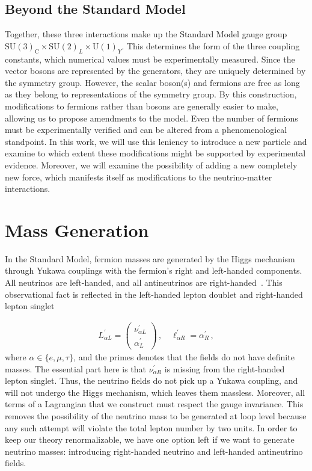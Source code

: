 \subsection{Beyond the Standard Model}
Together, these three interactions make up the Standard Model gauge group $\mathrm{SU}(3)_{\mathrm{C}} \times \mathrm{SU}(2)_{L} \times \mathrm{U}(1)_{Y}$. 
This determines the form of the three coupling constants, which numerical values must be experimentally measured. 
Since the vector bosons are represented by the generators, they are uniquely determined by the symmetry group. However, the scalar boson(s) and fermions are free as long as they
belong to representations of the symmetry group. By this construction, modifications to fermions rather than bosons are generally easier to make, allowing us to propose amendments to the model. Even the
number of fermions must be experimentally verified and can be altered from a phenomenological standpoint. In this work,
we will use this leniency to introduce a new particle and examine to which extent 
these modifications might be supported by experimental evidence. Moreover, we will examine the possibility of adding a new completely new force, which manifests itself as modifications to the neutrino-matter interactions.

\section{Mass Generation}
In the Standard Model, fermion masses are generated by the Higgs mechanism through Yukawa couplings with the fermion's right and left-handed components.
All neutrinos are left-handed, and all antineutrinos are right-handed~\cite{giunti}. This observational fact is reflected in the 
left-handed lepton doublet and right-handed lepton singlet

\begin{align}
    L^\prime_{\alpha L} = \begin{pmatrix}
            \nu^\prime_{\alpha L} \\
        \alpha^\prime_{L} 
    \end{pmatrix}\,, \quad
    \ell^\prime_{\alpha R} =
    \alpha^\prime_{R} \,,            
\end{align}
where $\alpha \in \{e,\mu,\tau\}$, and the primes denotes that the fields do not have definite masses.
The essential part here is that $\nu^\prime_{\alpha R}$ is missing from the right-handed lepton singlet.
Thus, the neutrino fields do not pick up a Yukawa coupling, 
and will not undergo the Higgs mechanism, which leaves them massless.
Moreover, all terms of a Lagrangian that we construct must respect the gauge invariance. This removes the possibility of the neutrino mass to be 
generated at loop level because any such attempt will violate the total lepton number by two units.
In order to keep our theory renormalizable, we have one option left if we want to generate neutrino masses: introducing right-handed neutrino and left-handed antineutrino fields. 

